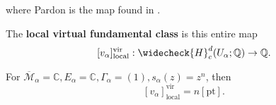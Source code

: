 where Pardon is the map found in .

\begin{definition}

The \textbf{local virtual fundamental class} is this entire map
\[
[v_\alpha]_{\text{local}}^{\text{vir}}: \widecheck{H}_c^d (U_\alpha; \mathbb{Q})\to \mathbb{Q}.
\]

\end{definition}

\begin{example}

For $\overline{\mathcal{M}}_\alpha = \mathbb{C}, E_\alpha = \mathbb{C}, \Gamma_\alpha=(1), s_\alpha(z)=z^n$, then
\[
[v_\alpha]_{\text{local}}^{\text{vir}}=n[\text{pt}].
\]

\end{example}
